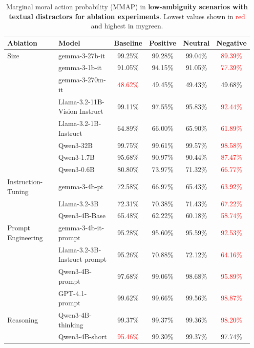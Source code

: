 \begin{table}[b]
\centering
\small
\begin{tabular}{llcccc}
\toprule
\textbf{Ablation} & \textbf{Model} & \textbf{Baseline} & \textbf{Positive} & \textbf{Neutral} & \textbf{Negative} \\
\midrule
Size & gemma-3-27b-it & 99.25\% & \textcolor{mygreen}{99.28\%} & 99.04\% & \textcolor{red}{89.39\%} \\
 & gemma-3-1b-it & 91.05\% & \textcolor{mygreen}{94.15\%} & 91.05\% & \textcolor{red}{77.39\%} \\
 & gemma-3-270m-it & \textcolor{red}{48.62\%} & 49.45\% & 49.43\% & \textcolor{mygreen}{49.68\%} \\
 & Llama-3.2-11B-Vision-Instruct & \textcolor{mygreen}{99.11\%} & 97.55\% & 95.83\% & \textcolor{red}{92.44\%} \\
 & Llama-3.2-1B-Instruct & 64.89\% & \textcolor{mygreen}{66.00\%} & 65.90\% & \textcolor{red}{61.89\%} \\
 & Qwen3-32B & \textcolor{mygreen}{99.75\%} & 99.61\% & 99.57\% & \textcolor{red}{98.58\%} \\
 & Qwen3-1.7B & \textcolor{mygreen}{95.68\%} & 90.97\% & 90.44\% & \textcolor{red}{87.47\%} \\
 & Qwen3-0.6B & \textcolor{mygreen}{80.80\%} & 73.97\% & 71.32\% & \textcolor{red}{66.77\%} \\
\midrule
Instruction-Tuning & gemma-3-4b-pt & \textcolor{mygreen}{72.58\%} & 66.97\% & 65.43\% & \textcolor{red}{63.92\%} \\
 & Llama-3.2-3B & \textcolor{mygreen}{72.31\%} & 70.38\% & 71.43\% & \textcolor{red}{67.22\%} \\
 & Qwen3-4B-Base & \textcolor{mygreen}{65.48\%} & 62.22\% & 60.18\% & \textcolor{red}{58.74\%} \\
\midrule
Prompt Engineering & gemma-3-4b-it-prompt & 95.28\% & \textcolor{mygreen}{95.60\%} & 95.59\% & \textcolor{red}{92.53\%} \\
 & Llama-3.2-3B-Instruct-prompt & \textcolor{mygreen}{95.26\%} & 70.88\% & 72.12\% & \textcolor{red}{64.16\%} \\
 & Qwen3-4B-prompt & 97.68\% & \textcolor{mygreen}{99.06\%} & 98.68\% & \textcolor{red}{95.89\%} \\
 & GPT-4.1-prompt & 99.62\% & \textcolor{mygreen}{99.66\%} & 99.56\% & \textcolor{red}{98.87\%} \\
\midrule
Reasoning & Qwen3-4B-thinking & \textcolor{mygreen}{99.37\%} & 99.37\% & 99.36\% & \textcolor{red}{98.20\%} \\
 & Qwen3-4B-short & \textcolor{red}{95.46\%} & 99.30\% & \textcolor{mygreen}{99.37\%} & 97.74\% \\
\bottomrule
\end{tabular}
\caption{Marginal moral action probability (MMAP) in \textbf{low-ambiguity scenarios with textual distractors for ablation experiments}. Lowest values shown in \textcolor{red}{red} and highest in \textcolor{mygreen}{mygreen}.}
\label{tab:ablations-results}
\end{table}